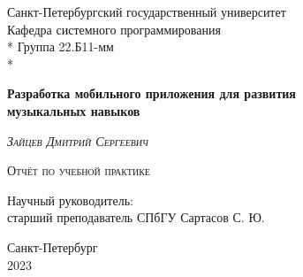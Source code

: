 \begin{titlepage}
\newpage

\begin{center}
Санкт-Петербургский государственный университет \\
\vspace{1cm}
Кафедра системного программирования \\*
Группа 22.Б11-мм \\*
\hrulefill
\end{center}

\vspace{8em}

\begin{center}
\Large \textbf{Разработка мобильного приложения для развития\\музыкальных навыков}
\end{center}

\vspace{2.5em}

\begin{center}
\LARGE \textsc{\textit{Зайцев Дмитрий Сергеевич }}
\end{center}

\begin{center}
\textsc{Отчёт по учебной практике}
\end{center}

\vspace{6em}

\begin{flushright}
Научный руководитель:\\
старший преподаватель СПбГУ Сартасов С. Ю.
\end{flushright}

\vspace{\fill}

\begin{center}
Санкт-Петербург\\2023
\end{center}

\end{titlepage}